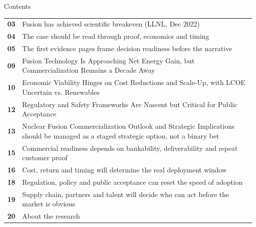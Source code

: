 \documentclass[10pt,a4paper]{article}
\begin{document}
\clearpage
{\sffamily\fontsize{26}{31}\selectfont\color{BONavy} Contents}\par\vspace{10pt}
\begin{tabularx}{\linewidth}{p{14mm}Y}
\textcolor{BOGreen}{\bfseries 03} & Fusion has achieved scientific breakeven (LLNL, Dec 2022) \\[5pt]
\textcolor{BOGreen}{\bfseries 04} & The case should be read through proof, economics and timing \\[5pt]
\textcolor{BOGreen}{\bfseries 05} & The first evidence pages frame decision readiness before the narrative \\[5pt]
\textcolor{BOGreen}{\bfseries 09} & Fusion Technology Is Approaching Net Energy Gain, but Commercialization Remains a Decade Away \\[5pt]
\textcolor{BOGreen}{\bfseries 10} & Economic Viability Hinges on Cost Reductions and Scale-Up, with LCOE Uncertain vs. Renewables \\[5pt]
\textcolor{BOGreen}{\bfseries 12} & Regulatory and Safety Frameworks Are Nascent but Critical for Public Acceptance \\[5pt]
\textcolor{BOGreen}{\bfseries 13} & Nuclear Fusion Commercialization Outlook and Strategic Implications should be managed as a staged strategic option, not a binary bet \\[5pt]
\textcolor{BOGreen}{\bfseries 15} & Commercial readiness depends on bankability, deliverability and repeat customer proof \\[5pt]
\textcolor{BOGreen}{\bfseries 16} & Cost, return and timing will determine the real deployment window \\[5pt]
\textcolor{BOGreen}{\bfseries 18} & Regulation, policy and public acceptance can reset the speed of adoption \\[5pt]
\textcolor{BOGreen}{\bfseries 19} & Supply chain, partners and talent will decide who can act before the market is obvious \\[5pt]
\textcolor{BOGreen}{\bfseries 20} & About the research \\[5pt]
\end{tabularx}
\clearpage
\end{document}
